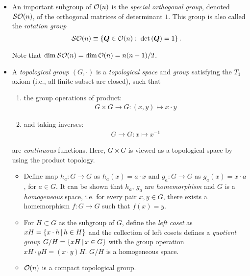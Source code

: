\documentclass[11pt]{article}
\begin{document}
\begin{itemize}
\item An important subgroup of ${\mathcal O}(n)$ is the \emph{special orthogonal group}, denoted ${\mathcal S}{\mathcal O}(n)$, of the orthogonal matrices of determinant $1$. This group is also called the \emph{rotation group}
\begin{align*}
{\mathcal S}{\mathcal O}(n) &\equiv \left\{\boldsymbol{Q}\in {\mathcal O}(n):\;  \det\left(\boldsymbol{Q}\right)= 1\right\}.
\end{align*}

Note that $\dim{{\mathcal S}{\mathcal O}(n)}= \dim{{\mathcal O}(n)} = n(n-1)/2$.


\item A \emph{topological group} $(G, \cdot)$ is a \emph{topological space} and \emph{group} satisfying the $T_{1}$ axiom (i.e., all finite subset are closed), such that 
\begin{enumerate}
\item the group operations of product:
\begin{align*}
G\times G \to G : (x,y)\mapsto x\cdot y
\end{align*}
\item and taking inverses:
\begin{align*}
G\to G : x \mapsto x^{-1}
\end{align*}
\end{enumerate}
are \emph{continuous} functions. Here, $G\times G$ is viewed as a topological space by using the product topology.
\begin{itemize}
\item Define map $h_{a}: G\to G$ as $h_{a}(x) = a\cdot x$ and $g_{a}: G\to G$ as $g_{a}(x) = x \cdot a$, for $a\in G$. It can be shown that $h_{a}, \, g_{a}$ are \emph{homemorphism} and $G$ is a \emph{homogeneous} space, i.e. for every pair $x,y\in G$, there exists a homemorphism $f: G\to G$ such that $f(x) = y$. 

\item For $H\subset G$ as the subgroup of $G$, define the \emph{left coset} as $xH = \left\{x\cdot h \,|\, h\in H\right\}$ and the collection of left cosets defines a \emph{quotient group} $G/H = \left\{ xH\, |\, x\in G\right\}$ with the group operation $xH \cdot yH = (x\cdot y) H$.  $G/H$ is a homogeneous space.  

\item ${\mathcal O}(n)$ is a compact topological group. \\[5pt]
\end{itemize}


\end{itemize}
\end{document}
